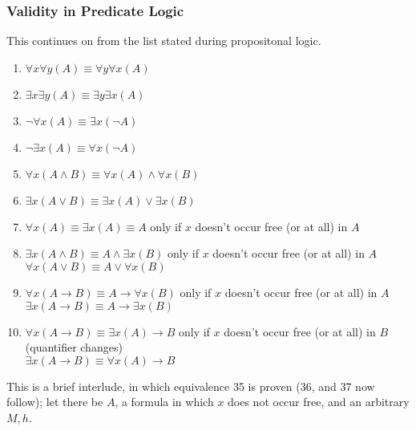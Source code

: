 \documentclass[a4paper, 12pt]{article}
\begin{document}
            \subsubsection*{Validity in Predicate Logic}
            This continues on from the list stated during propositonal logic.
            \begin{enumerate}[1.]
                \itemsep0em
                \setcounter{enumi}{27}
                \item $\forall x \forall y (A) \equiv \forall y \forall x (A)$
                \item $\exists x \exists y (A) \equiv \exists y \exists x (A)$
                \item $\neg \forall x (A) \equiv \exists x (\neg A)$
                \item $\neg \exists x (A) \equiv \forall x (\neg A)$
                \item $\forall x (A \land B) \equiv \forall x (A) \land \forall x (B)$
                \item $\exists x (A \lor B) \equiv \exists x (A) \lor \exists x (B)$
                \item $\forall x (A) \equiv \exists x (A) \equiv A$ \hfill only if $x$ doesn't occur free (or at all) in $A$
                \item $\exists x (A \land B) \equiv A \land \exists x (B)$ \hfill only if $x$ doesn't occur free (or at all) in $A$ \\ $\forall x (A \lor B) \equiv A \lor \forall x (B)$
                \item $\forall x (A \rightarrow B) \equiv A \rightarrow \forall x (B)$ \hfill only if $x$ doesn't occur free (or at all) in $A$ \\ $\exists x (A \rightarrow B) \equiv A \rightarrow \exists x (B)$
                \item $\forall x (A \rightarrow B) \equiv \exists x (A) \rightarrow B$ \hfill only if $x$ doesn't occur free (or at all) in $B$ (quantifier changes) \\ $\exists x (A \rightarrow B) \equiv \forall x (A) \rightarrow B$
            \end{enumerate}
            This is a brief interlude, in which equivalence 35 is proven (36, and 37 now follow); let there be $A$, a formula in which $x$ does not occur free, and an arbitrary $M, h$.
\end{document}
